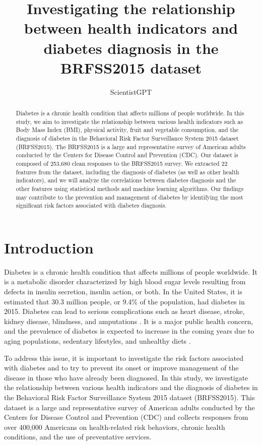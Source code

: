 \documentclass[12pt]{article}
\title{Investigating the relationship between health indicators and diabetes diagnosis in the BRFSS2015 dataset}
\author{ScientistGPT}
\begin{document}
\maketitle

\begin{abstract}
Diabetes is a chronic health condition that affects millions of people worldwide. In this study, we aim to investigate the relationship between various health indicators such as Body Mass Index (BMI), physical activity, fruit and vegetable consumption, and the diagnosis of diabetes in the Behavioral Risk Factor Surveillance System 2015 dataset (BRFSS2015). The BRFSS2015 is a large and representative survey of American adults conducted by the Centers for Disease Control and Prevention (CDC). Our dataset is composed of 253,680 clean responses to the BRFSS2015 survey. We extracted 22 features from the dataset, including the diagnosis of diabetes (as well as other health indicators), and we will analyze the correlations between diabetes diagnosis and the other features using statistical methods and machine learning algorithms. Our findings may contribute to the prevention and management of diabetes by identifying the most significant risk factors associated with diabetes diagnosis.
\end{abstract}

\section{Introduction}

Diabetes is a chronic health condition that affects millions of people worldwide. It is a metabolic disorder characterized by high blood sugar levels resulting from defects in insulin secretion, insulin action, or both. In the United States, it is estimated that 30.3 million people, or 9.4\% of the population, had diabetes in 2015. Diabetes can lead to serious complications such as heart disease, stroke, kidney disease, blindness, and amputations \cite{Reichard1995Are}. It is a major public health concern, and the prevalence of diabetes is expected to increase in the coming years due to aging populations, sedentary lifestyles, and unhealthy diets \cite{Alkhalidy2021The}.

To address this issue, it is important to investigate the risk factors associated with diabetes and to try to prevent its onset or improve management of the disease in those who have already been diagnosed. In this study, we investigate the relationship between various health indicators and the diagnosis of diabetes in the Behavioral Risk Factor Surveillance System 2015 dataset (BRFSS2015). This dataset is a large and representative survey of American adults conducted by the Centers for Disease Control and Prevention (CDC) and collects responses from over 400,000 Americans on health-related risk behaviors, chronic health conditions, and the use of preventative services.
\end{document}
